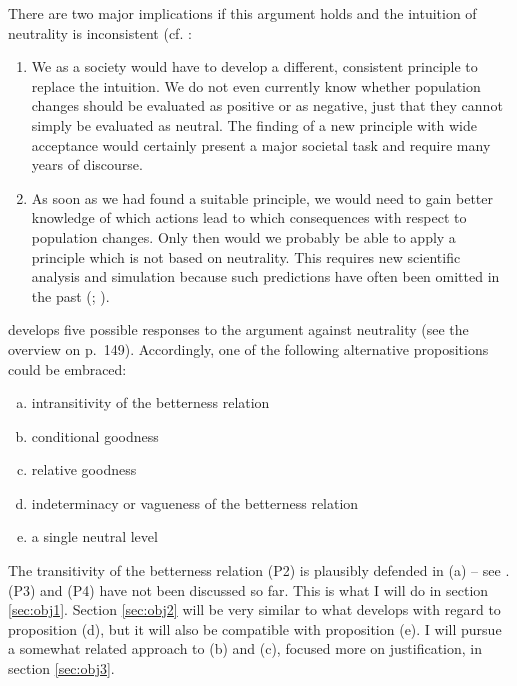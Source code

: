 There are two major implications if this argument holds and the intuition of neutrality is inconsistent (cf. : 

\begin{enumerate}
\item We as a society would have to develop a different, consistent principle to replace the intuition. We do not even currently know whether population changes should be evaluated as positive or as negative, just that they cannot simply be evaluated as neutral. The finding of a new principle with wide acceptance would certainly present a major societal task and require many years of discourse. 
\item As soon as we had found a suitable principle, we would need to gain better knowledge of which actions lead to which consequences with respect to population changes. Only then would we probably be able to apply a principle which is not based on neutrality. This requires new scientific analysis and simulation because such predictions have often been omitted in the past (; ). 
\end{enumerate}

 develops five possible responses to the argument against neutrality (see the overview on p.~149). Accordingly, one of the following alternative propositions could be embraced: 

\begin{enumerate}[(a)]
\item intransitivity of the betterness relation 
\item conditional goodness 
\item relative goodness 
\item indeterminacy or vagueness of the betterness relation 
\item a single neutral level
\end{enumerate}

The transitivity of the betterness relation (P2) is plausibly defended in (a) -- see . 
(P3) and (P4) have not been discussed so far. This is what I will do in section \ref{sec:obj1}. 
Section \ref{sec:obj2} will be very similar to what  develops with regard to proposition (d), but it will also be compatible with proposition (e). 
I will pursue a somewhat related approach to (b) and (c), focused more on justification, in section \ref{sec:obj3}.